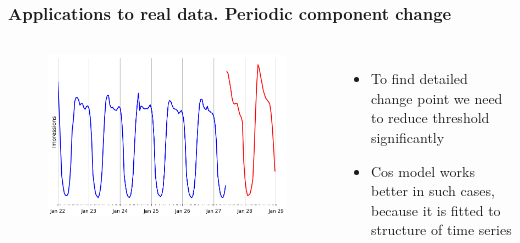 \documentclass[intlimits, 9pt, unicode]{beamer}
\begin{document}
\begin{frame}
    \frametitle{Applications to real data. Periodic component change}
  \begin{columns}[T,onlytextwidth]
	\begin{figure}
	\includegraphics[scale=0.2]{images/methods_comparison_6}
	\end{figure}
	    \begin{itemize}
	    	\item To find detailed change point we need to reduce threshold significantly
		\item Cos model works better in such cases, because it is fitted to structure of time series
	    \end{itemize}
     \end{columns}
\end{frame}
\end{document}
